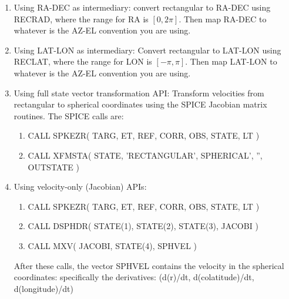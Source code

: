 \documentclass[crop=false,class=book]{standalone}
\begin{document}
            \begin{enumerate}
                \item Using RA-DEC as intermediary: convert rectangular to RA-DEC using RECRAD, where the range for RA is $[0,2\pi]$. Then map RA-DEC to whatever is the AZ-EL convention you are using.
                \item Using LAT-LON as intermediary: Convert rectangular to LAT-LON using RECLAT, where the range for LON is $[-\pi,\pi]$. Then map LAT-LON to whatever is the AZ-EL convention you are using.
                \item Using full state vector transformation API: Transform velocities from rectangular to spherical coordinates using the SPICE Jacobian matrix routines. The SPICE calls are:
                \begin{enumerate}
                    \item CALL SPKEZR( TARG, ET, REF, CORR, OBS, STATE, LT )
                    \item CALL XFMSTA( STATE, 'RECTANGULAR', SPHERICAL', '', OUTSTATE )
                \end{enumerate}
                \item Using velocity-only (Jacobian) APIs:
                \begin{enumerate}
                    \item CALL SPKEZR( TARG, ET, REF, CORR, OBS, STATE, LT )
                    \item CALL DSPHDR( STATE(1), STATE(2), STATE(3), JACOBI )
                    \item CALL MXV( JACOBI, STATE(4), SPHVEL )
                \end{enumerate}
                After these calls, the vector SPHVEL contains the velocity in the spherical coordinates: specifically the derivatives: (d(r)/dt, d(colatitude)/dt, d(longitude)/dt)
            \end{enumerate}
\end{document}
